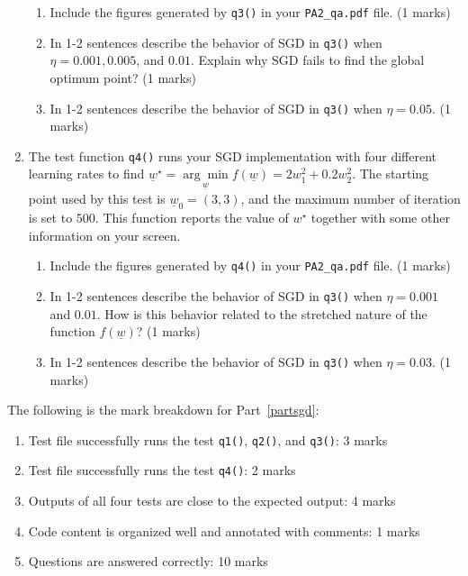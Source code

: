 \documentclass{article}
\theoremstyle{definition}
\begin{document}
\begin{enumerate}[label=\ref{partsgd}.\alph*]
	\begin{enumerate}[label=\ref{b1b1b}.\roman*]
		\item Include the figures generated by \verb|q3()| in your \verb|PA2_qa.pdf| file. (1 marks)
		\item In 1-2 sentences describe the behavior of SGD in \verb|q3()| when $\eta=0.001, 0.005$, and $0.01$. Explain why SGD fails to find the global optimum point? (1 marks)
		\item In 1-2 sentences describe the behavior of SGD in \verb|q3()| when $\eta=0.05$. (1 marks)
	\end{enumerate}
	\item \label{c1c1c}The test function \verb|q4()| runs your SGD implementation with four different learning rates to find $\underline{w}^\star = \underset{\underline{w}}{\arg \min} f(\underline{w}) = 2w_1^2 + 0.2w_2^2$. The starting point used by this test is $\underline{w}_0=(3,3)$, and the maximum number of iteration is set to $500$. This function reports the value of $w^\star$ together with some other information on your screen.
	\begin{enumerate}[label=\ref{c1c1c}.\roman*]
		\item Include the figures generated by \verb|q4()| in your \verb|PA2_qa.pdf| file. (1 marks)
		\item In 1-2 sentences describe the behavior of SGD in \verb|q3()| when $\eta=0.001$ and $0.01$. How is this behavior related to the stretched nature of the function $f(\underline{w})$? (1 marks)
		\item In 1-2 sentences describe the behavior of SGD in \verb|q3()| when $\eta=0.03$. (1 marks)
	\end{enumerate}
\end{enumerate}
The following is the mark breakdown for Part~\ref{partsgd}:
\begin{enumerate}[label=(\roman*)]
	\item Test file successfully runs the test \verb|q1()|, \verb|q2()|, and \verb|q3()|: 3 marks
	\item Test file successfully runs the test \verb|q4()|: 2 marks
	\item Outputs of all four tests are close to the expected output: 4 marks
	\item Code content is organized well and annotated with comments: 1 marks
	\item Questions are answered correctly: 10 marks
\end{enumerate}
\end{document}
